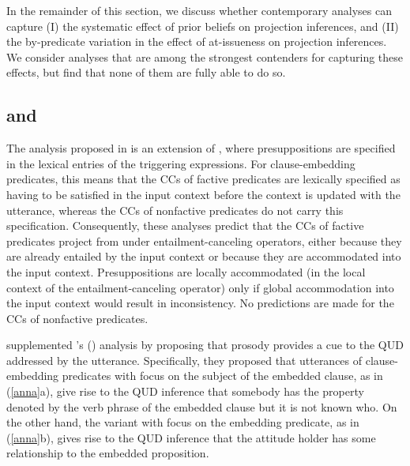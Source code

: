 \documentclass[11pt,fleqn]{article}
\newcommand{\6}{\mbox{$[\hspace*{-.6mm}[$}}
\newcommand{\9}{\mbox{$]\hspace*{-.6mm}]$}}
\newcommand{\citetpos}[1]{\citeauthor{#1}'s (\citeyear{#1})}
\begin{document}
In the remainder of this section, we discuss whether contemporary analyses can capture (I) the systematic effect of prior beliefs on projection inferences, and (II) the by-predicate variation in the effect of at-issueness on projection inferences. We consider analyses that are among the strongest contenders for capturing these effects, but find that none of them are fully able to do so.

\subsection{\cite{heim83} and \cite{djaerv-bacovcin2020}}\label{s41}

The analysis proposed in \cite{djaerv-bacovcin2020} is an extension of \cite{heim83}, where presuppositions are specified in the lexical entries of the triggering expressions. For clause-embedding predicates, this means that the CCs of factive predicates are lexically specified as having to be satisfied in the input context before the context is updated with the utterance, whereas the CCs of nonfactive predicates do not carry this specification. Consequently, these analyses predict that the CCs of factive predicates project from under entailment-canceling operators, either because they are already entailed by the input context or because they are accommodated into the input context. Presuppositions are locally accommodated (in the local context of the entailment-canceling operator) only if global accommodation into the input context would result in inconsistency. No predictions are made for the CCs of nonfactive predicates.

\cite{djaerv-bacovcin2020} supplemented \citetpos{heim83} analysis by proposing that prosody provides a cue to the QUD addressed by the utterance. Specifically, they proposed that utterances of clause-embedding predicates with focus on the subject of the embedded clause, as in (\ref{anna}a), give rise to the QUD inference that somebody has the property denoted by the verb phrase of the embedded clause but it is not known who. On the other hand, the variant with focus on the embedding predicate, as in (\ref{anna}b), gives rise to the QUD inference that the attitude holder has some relationship to the embedded proposition.
\end{document}
